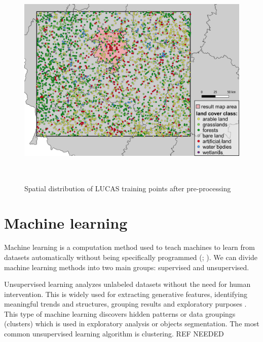 \documentclass{amuthesis}
\begin{document}
\begin{figure}[t]

{\centering \includegraphics[width=1\textwidth,height=4.16667in]{./figures/lucas_distribution.png}

}

\caption{\label{fig-rycina3}Spatial distribution of LUCAS training
points after pre-processing}

\end{figure}

\hypertarget{sec-ml}{%
\section{Machine learning}\label{sec-ml}}

Machine learning is a computation method used to teach machines to learn
from datasets automatically without being specifically programmed
(\textcite{mahesh_machine_2018}; \textcite{sarker_machine_2021}). We can
divide machine learning methods into two main groups: supervised and
unsupervised.

Unsupervised learning analyzes unlabeled datasets without the need for
human intervention. This is widely used for extracting generative
features, identifying meaningful trends and structures, grouping results
and exploratory purposes \autocite{sarker_machine_2021}. This type of
machine learning discovers hidden patterns or data groupings (clusters)
which is used in exploratory analysis or objects segmentation. The most
common unsupervised learning algorithm is clustering. REF NEEDED
\end{document}

